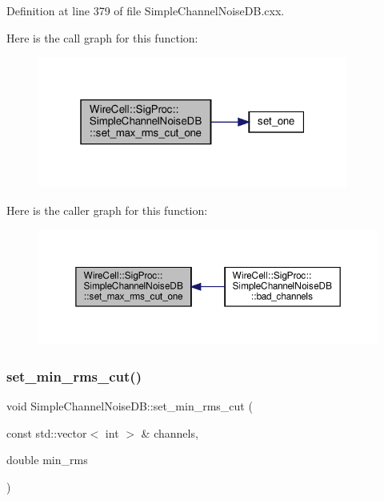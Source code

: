 Definition at line 379 of file Simple\+Channel\+Noise\+D\+B.\+cxx.

Here is the call graph for this function\+:
\nopagebreak
\begin{figure}[H]
\begin{center}
\leavevmode
\includegraphics[width=289pt]{class_wire_cell_1_1_sig_proc_1_1_simple_channel_noise_d_b_ab82464e57bc12304c2d90e9eb075a930_cgraph}
\end{center}
\end{figure}
Here is the caller graph for this function\+:
\nopagebreak
\begin{figure}[H]
\begin{center}
\leavevmode
\includegraphics[width=350pt]{class_wire_cell_1_1_sig_proc_1_1_simple_channel_noise_d_b_ab82464e57bc12304c2d90e9eb075a930_icgraph}
\end{center}
\end{figure}
\mbox{\label{class_wire_cell_1_1_sig_proc_1_1_simple_channel_noise_d_b_a5113500df9dcd76defe1493534c4c9bc}} 
\subsubsection{\texorpdfstring{set\+\_\+min\+\_\+rms\+\_\+cut()}{set\_min\_rms\_cut()}}
{\footnotesize\ttfamily void Simple\+Channel\+Noise\+D\+B\+::set\+\_\+min\+\_\+rms\+\_\+cut (\begin{DoxyParamCaption}\item[{const std\+::vector$<$ int $>$ \&}]{channels,  }\item[{double}]{min\+\_\+rms }\end{DoxyParamCaption})}



